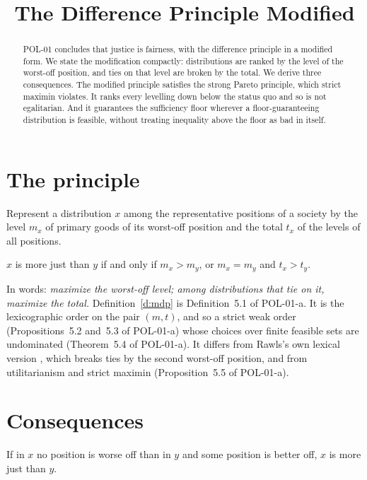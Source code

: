 \documentclass{situationist-preprint}
\title{The Difference Principle Modified}
\begin{document}
\maketitle

\begin{abstract}
POL-01 concludes that justice is fairness, with the difference principle in a modified form. We state the modification compactly: distributions are ranked by the level of the worst-off position, and ties on that level are broken by the total. We derive three consequences. The modified principle satisfies the strong Pareto principle, which strict maximin violates. It ranks every levelling down below the status quo and so is not egalitarian. And it guarantees the sufficiency floor wherever a floor-guaranteeing distribution is feasible, without treating inequality above the floor as bad in itself.
\end{abstract}

\section{The principle}

Represent a distribution $x$ among the representative positions of a society by the level $m_x$ of primary goods of its worst-off position and the total $t_x$ of the levels of all positions.

\begin{definition}\label{d:mdp}
$x$ is more just than $y$ if and only if $m_x > m_y$, or $m_x = m_y$ and $t_x > t_y$.
\end{definition}

In words: \emph{maximize the worst-off level; among distributions that tie on it, maximize the total.} Definition~\ref{d:mdp} is Definition~5.1 of POL-01-a. It is the lexicographic order on the pair $(m, t)$, and so a strict weak order (Propositions~5.2 and~5.3 of POL-01-a) whose choices over finite feasible sets are undominated (Theorem~5.4 of POL-01-a). It differs from Rawls's own lexical version \citep[\S 13]{Rawls1971}, which breaks ties by the second worst-off position, and from utilitarianism and strict maximin (Proposition~5.5 of POL-01-a).

\section{Consequences}

\begin{proposition}\label{p:pareto}
If in $x$ no position is worse off than in $y$ and some position is better off, $x$ is more just than $y$.
\end{proposition}
\end{document}
